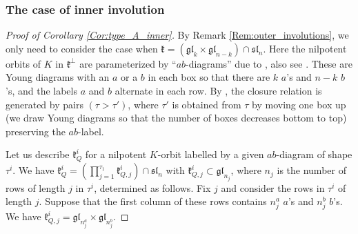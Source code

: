 \documentclass[12pt]{amsart}
\newcommand{\Orb}{\mathbb{O}}
\newcommand{\slf}{\mathfrak{sl}}
\theoremstyle{definition}
\numberwithin{equation}{section}
\begin{document}
\subsubsection{The case of inner involution}\label{SS:inner}
\begin{proof}[Proof of Corollary \ref{Cor:type_A_inner}]
By Remark \ref{Rem:outer_involutions}, we only need to consider the case when
$\mathfrak{k}=(\mathfrak{gl}_k\times \mathfrak{gl}_{n-k})\cap
\mathfrak{sl}_n$. Here the nilpotent orbits of $K$ in $\mathfrak{k}^\perp$ are parameterized
by ``$ab$-diagrams'' due to \cite[Section 4]{KP_normal}, also see \cite[Section 2.2]{Ohta1}. These are Young diagrams with an $a$ or a $b$ in each box so that there are $k$ $a$'s and $n-k$ $b$'s, and the labels $a$ and $b$ alternate in each row.
By \cite[Theorem 3]{Ohta2}, the closure relation is generated by pairs $(\tau>\tau')$, where $\tau'$ is obtained from
$\tau$ by moving one box up (we draw Young diagrams so that the number of boxes decreases
bottom to top) preserving the $ab$-label.

Let us describe $\mathfrak{k}^i_Q$ for a nilpotent $K$-orbit labelled by a given $ab$-diagram
of shape $\tau^i$.
We have $\mathfrak{k}_Q^i=(\prod_{j=1}^{\tau_1}\mathfrak{k}^i_{Q,j})\cap \slf_n$
with $\mathfrak{k}^i_{Q,j}\subset \mathfrak{gl}_{n_j}$, where $n_j$ is the number of rows of length $j$ in $\tau^i$, determined as follows.  Fix $j$ and consider the rows in $\tau^i$ of length $j$.
Suppose that the first column of these rows contains $n_j^a$ $a$'s and
$n_j^b$ $b$'s.   We have $\mathfrak{k}^i_{Q,j}=\mathfrak{gl}_{n_j^a}\times
\mathfrak{gl}_{n_j^b}$.


\end{proof}
\end{document}
